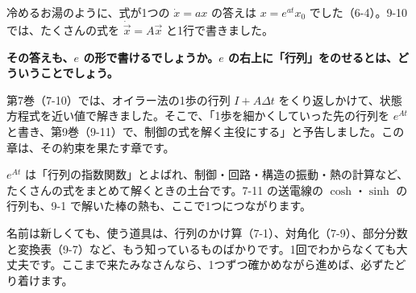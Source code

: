 \begin{hatena}
\noindent\begin{minipage}[c]{0.52\linewidth}
\raggedright
冷めるお湯のように、式が1つの $\dot x=ax$ の答えは $x=e^{at}x_0$ でした（6-4）。9-10 では、たくさんの式を $\dot{\vec x}=A\vec x$ と1行で書きました。\par\vspace{4pt}
\textbf{その答えも、$e$ の形で書けるでしょうか。$e$ の右上に「行列」をのせるとは、どういうことでしょう。}
\end{minipage}\hfill
\begin{minipage}[c]{0.44\linewidth}
\centering
{}
\end{minipage}
\end{hatena}

\noindent 第7巻（7-10）では、オイラー法の1歩の行列 $I+A\Delta t$ をくり返しかけて、状態方程式を近い値で解きました。そこで、「1歩を細かくしていった先の行列を $e^{At}$ と書き、第9巻（9-11）で、制御の式を解く主役にする」と予告しました。この章は、その約束を果たす章です。

$e^{At}$ は「行列の指数関数」とよばれ、制御・回路・構造の振動・熱の計算など、たくさんの式をまとめて解くときの土台です。7-11 の送電線の $\cosh$・$\sinh$ の行列も、9-1 で解いた棒の熱も、ここで1つにつながります。

名前は新しくても、使う道具は、行列のかけ算（7-1）、対角化（7-9）、部分分数と変換表（9-7）など、もう知っているものばかりです。1回でわからなくても大丈夫です。ここまで来たみなさんなら、1つずつ確かめながら進めば、必ずたどり着けます。

